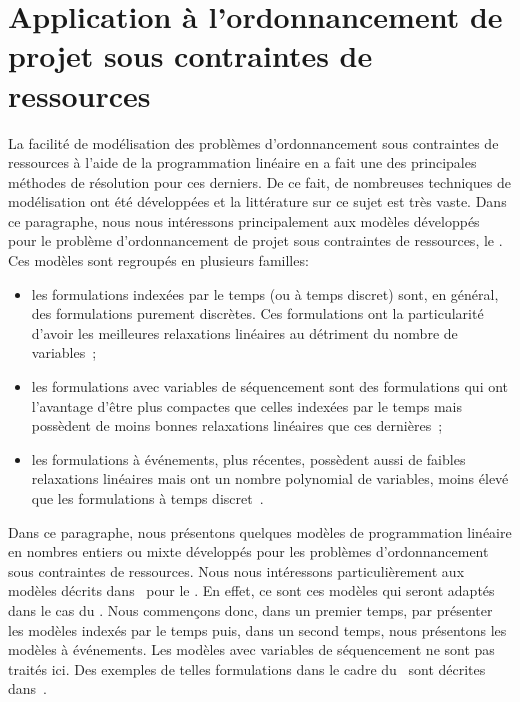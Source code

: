 \section[Application au RCPSP]{Application à l'ordonnancement de projet sous contraintes de
  ressources}   
\label{sec:PLNE_ordo_res}

La facilité de modélisation des problèmes d'ordonnancement sous
contraintes de ressources à l'aide de la programmation linéaire en a
fait une des principales méthodes de résolution pour ces derniers. De
ce fait, de nombreuses techniques de modélisation ont été développées
et la littérature sur ce sujet est très vaste. Dans ce paragraphe,
nous nous intéressons principalement aux modèles développés pour le
problème d'ordonnancement de projet sous contraintes de ressources, le
\RCPSP. Ces modèles sont regroupés en plusieurs familles:
\begin{itemize}
\item les formulations indexées par le temps (ou à temps discret)
sont, en général, des formulations purement discrètes. Ces
formulations ont la particularité d'avoir les meilleures relaxations
linéaires au détriment du nombre de
variables~\cite{CAVT,ex_RCPSP_discret};
\item les formulations avec variables de séquencement sont des
formulations qui ont l'avantage d'être plus compactes que celles
indexées par le temps mais possèdent de moins bonnes relaxations
linéaires que ces dernières~\cite{AVT,AMR};
\item les formulations à événements, plus récentes, possèdent aussi de
faibles relaxations linéaires mais ont un nombre polynomial de
variables, moins élevé que  les formulations à temps
discret~\cite{modele_RCPSP}.
\end{itemize}

Dans ce paragraphe, nous présentons quelques modèles de
programmation linéaire en nombres entiers ou mixte développés pour les
problèmes d'ordonnancement sous contraintes de ressources. Nous nous
intéressons particulièrement aux modèles décrits
dans~\cite{modele_RCPSP} pour le \RCPSP. En effet, ce sont ces modèles
qui seront adaptés dans le cas du \CECSP. Nous commençons donc, dans
un premier temps, par présenter les modèles indexés par le temps puis,
dans un second temps, nous présentons les modèles à événements. Les
modèles avec variables de séquencement ne sont pas traités ici. Des
exemples de telles formulations dans le cadre du \RCPSP~sont décrites
dans~\cite{ADN}.

